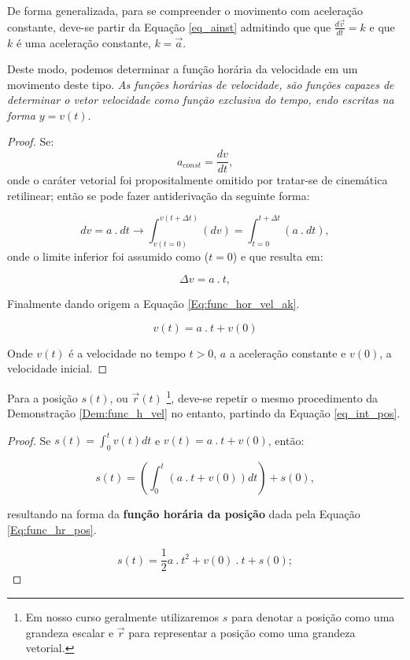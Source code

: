 \documentclass[a4paper, 11pt]{report}
\newtheorem{proof}{Demonstração}
\begin{document}
De forma generalizada, para se compreender o movimento com aceleração constante,
deve-se partir da Equação \ref{eq_ainst} admitindo que que 
$\frac{d \vec{v}}{dt} = k$ e que $k$ é uma aceleração constante, $k = \vec{a}$.

Deste modo, podemos determinar a função horária da velocidade em um movimento 
deste tipo. \emph{As funções horárias de velocidade, são funções capazes de 
determinar o vetor velocidade como função exclusiva do tempo, endo escritas na
forma} $y = v(t)$. 

\begin{proof}
    \label{Dem:func_h_vel}
    Se:
    $$
    a_{const} = \frac{dv}{dt},
    $$
    onde o caráter vetorial foi propositalmente omitido por tratar-se de 
    cinemática retilinear; então se pode fazer antiderivação da seguinte forma:

    $$
        dv = a \: . \: dt \rightarrow 
        \int_{v(t=0)}^{v(t+\Delta t)} (dv) = \int_{t=0}^{t+\Delta t} (a \: . \: dt),
    $$
    onde o limite inferior foi assumido como ($t=0$) e que resulta em:

    $$
    \Delta v = a\: . \:t,
    $$

    Finalmente dando origem a Equação \ref{Eq:func_hor_vel_ak}.
    
    \begin{equation}
        v(t) = a\: . \:t + v(0)
        \label{Eq:func_hor_vel_ak}
    \end{equation}

    Onde $v(t)$ é a velocidade no tempo $t > 0$, $a$ a aceleração constante e 
    $v(0)$, a velocidade inicial.
\end{proof}

Para a posição $s(t)$, ou $\vec{r}(t)$ \footnote{Em nosso curso geralmente 
utilizaremos $s$ para denotar a posição como uma grandeza escalar e $\vec{r}$
para representar a posição como uma grandeza vetorial.}, deve-se repetir o 
mesmo procedimento da Demonstração \ref{Dem:func_h_vel} no entanto, partindo da
Equação \ref{eq_int_pos}.

\begin{proof}
    Se $s(t) = \int_{0}^{t} v(t) dt$ e $v(t) = a\: . \:t + v(0)$, então:

    $$
        s(t) = \left(\int_{0}^{t} (a\: . \:t + v(0)) dt \right) + s(0),
    $$

    resultando na forma da \textbf{função horária da posição} dada pela 
    Equação \ref{Eq:func_hr_pos}.

    \begin{equation}
        s(t) =  \frac{1}{2} a \: . \: t^2 + v(0)\: . \: t + s(0);
        \label{Eq:func_hr_pos}
    \end{equation}

\end{proof}
\end{document}
